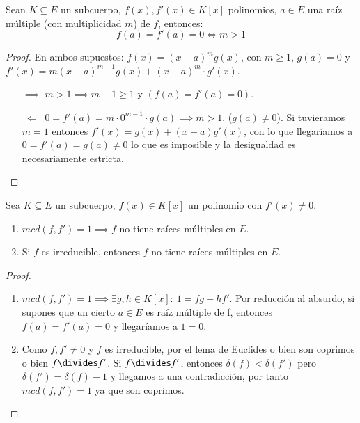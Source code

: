 \begin{pro}
    Sean $K \subseteq E$ un subcuerpo, $f(x), f'(x) \in K[x]$ polinomios,  $a \in E$ una raíz múltiple (con multiplicidad $m$) de $f$, entonces:
    $$
        f(a) = f'(a) = 0 \iff m > 1
    $$
\end{pro}
\begin{proof}
    En ambos supuestos: $f(x) = (x - a)^m g(x)$, con $m \geq 1$, $g(a) = 0$ y $f'(x) = m (x - a)^{m-1} g(x) + (x-a)^{m} \cdot g'(x)$.
    \begin{itemize}
        \item[$\implies$] $m > 1 \implies m-1 \geq 1$ y $(f(a) = f'(a) = 0)$.
        \item[$\ \Longleftarrow\ $] $0 = f'(a) = m \cdot 0^{m-1} \cdot g(a) \implies m > 1$. ($g(a) \neq 0$).
        Si tuvieramos $m = 1$ entonces $f'(x) = g(x) + (x-a) g'(x)$, con lo que llegaríamos a $0 = f'(a) = g(a) \neq 0$ lo que es imposible y la desigualdad es necesariamente estricta.
    \end{itemize}
\end{proof}

\begin{thm}
    Sea $K \subseteq E$ un subcuerpo, $f(x) \in K[x]$ un polinomio con $f'(x) \neq 0$.
    \begin{enumerate}
        \item $mcd(f, f') = 1 \implies f$ no tiene raíces múltiples en $E$.
        \item Si $f$ es irreducible, entonces $f$ no tiene raíces múltiples en $E$.
    \end{enumerate}
\end{thm}

\begin{proof}$ $
    \begin{enumerate}
        \item $mcd(f, f') = 1 \implies \exists g, h \in K[x]:\ 1 = fg + hf'$. Por reducción al absurdo, si supones que un cierto $a \in E$ es raíz múltiple de f, entonces $f(a) = f'(a) = 0$ y llegaríamos a $1 = 0$.
        \item Como $f, f' \neq 0$ y $f$ es irreducible, por el lema de Euclides o bien son coprimos o bien $f \divides f'$. Si $f \divides f'$, entonces $\delta(f) < \delta(f')$ pero $\delta(f') = \delta(f) - 1$ y llegamos a una contradicción, por tanto $mcd(f, f')=1$ ya que son coprimos.
    \end{enumerate}
\end{proof}

